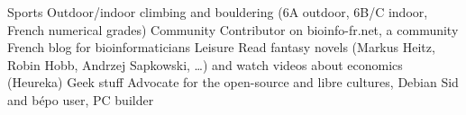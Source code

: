 
\begin{cvskills}

\cvskill
    {Sports} %
    {Outdoor/indoor climbing and bouldering (6A outdoor, 6B/C indoor, French numerical grades)} %
\cvskill
    {Community} %
    {Contributor on bioinfo-fr.net, a community French blog for bioinformaticians} %
\cvskill
    {Leisure} %
    {Read fantasy novels (Markus Heitz, Robin Hobb, Andrzej Sapkowski, …) and watch videos about economics (Heureka)} %
\cvskill
    {Geek stuff} %
    {Advocate for the open-source and libre cultures, Debian Sid and bépo user, PC builder} %

\end{cvskills}